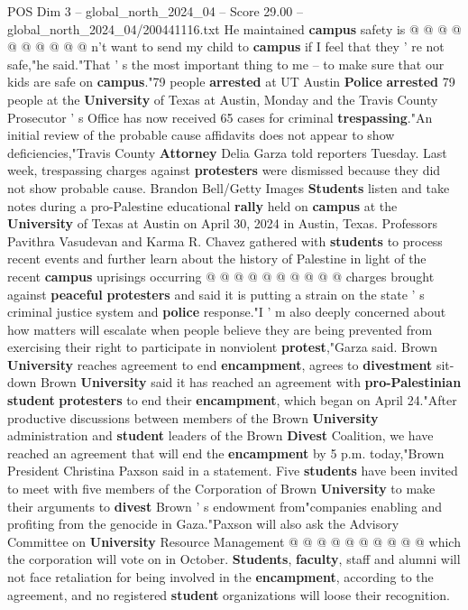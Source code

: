 \begin{textsample}{POS Dim 3 – global\_north\_2024\_04 – Score 29.00 – global\_north\_2024\_04/200441116.txt}
He maintained \textbf{campus} safety is @ @ @ @ @ @ @ @ @ @ n't want to send my child to \textbf{campus} if I feel that they ' re not safe,"he said."That ' s the most important thing to me -- to make sure that our kids are safe on \textbf{campus}."79 people \textbf{arrested} at UT Austin \textbf{Police} \textbf{arrested} 79 people at the \textbf{University} of Texas at Austin, Monday and the Travis County Prosecutor ' s Office has now received 65 cases for criminal \textbf{trespassing}."An initial review of the probable cause affidavits does not appear to show deficiencies,"Travis County \textbf{Attorney} Delia Garza told reporters Tuesday.
Last week, trespassing charges against \textbf{protesters} were dismissed because they did not show probable cause.
Brandon Bell/Getty Images \textbf{Students} listen and take notes during a pro-Palestine educational \textbf{rally} held on \textbf{campus} at the \textbf{University} of Texas at Austin on April 30, 2024 in Austin, Texas.
Professors Pavithra Vasudevan and Karma R.
Chavez gathered with \textbf{students} to process recent events and further learn about the history of Palestine in light of the recent \textbf{campus} uprisings occurring @ @ @ @ @ @ @ @ @ @ charges brought against \textbf{peaceful} \textbf{protesters} and said it is putting a strain on the state ' s criminal justice system and \textbf{police} response."I ' m also deeply concerned about how matters will escalate when people believe they are being prevented from exercising their right to participate in nonviolent \textbf{protest},"Garza said.
Brown \textbf{University} reaches agreement to end \textbf{encampment}, agrees to \textbf{divestment} sit-down Brown \textbf{University} said it has reached an agreement with \textbf{pro-Palestinian} \textbf{student} \textbf{protesters} to end their \textbf{encampment}, which began on April 24."After productive discussions between members of the Brown \textbf{University} administration and \textbf{student} leaders of the Brown \textbf{Divest} Coalition, we have reached an agreement that will end the \textbf{encampment} by 5 p.m. today,"Brown President Christina Paxson said in a statement.
Five \textbf{students} have been invited to meet with five members of the Corporation of Brown \textbf{University} to make their arguments to \textbf{divest} Brown ' s endowment from"companies enabling and profiting from the genocide in Gaza."Paxson will also ask the Advisory Committee on \textbf{University} Resource Management @ @ @ @ @ @ @ @ @ @ which the corporation will vote on in October. \textbf{Students}, \textbf{faculty}, staff and alumni will not face retaliation for being involved in the \textbf{encampment}, according to the agreement, and no registered \textbf{student} organizations will loose their recognition.

\end{textsample}
